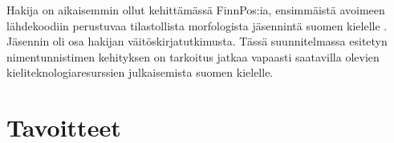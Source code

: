 \documentclass[12pt,a4paper,finnish,oneside]{article}
\begin{document}
Hakija on aikaisemmin ollut kehittämässä FinnPos:ia, ensimmäistä avoimeen lähdekoodiin perustuvaa tilastollista morfologista jäsennintä suomen kielelle \cite{finnpos}. Jäsennin oli osa hakijan väitöskirjatutkimusta. Tässä suunnitelmassa esitetyn nimentunnistimen kehityksen on tarkoitus jatkaa vapaasti saatavilla olevien kieliteknologiaresurssien julkaisemista suomen kielelle.








\section{Tavoitteet}
\end{document}
